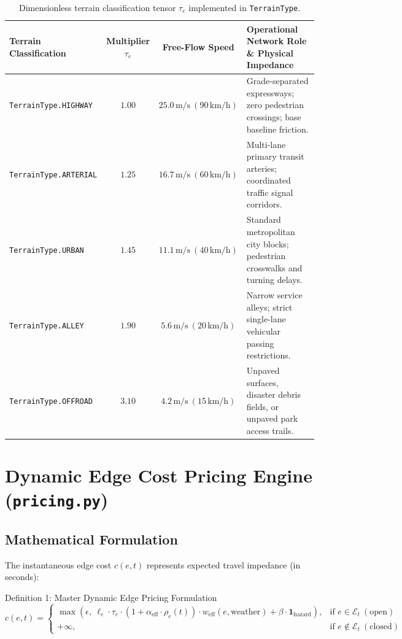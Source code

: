 \documentclass[10pt,a4paper]{article}
\begin{document}
\begin{table}[H]
\centering
\sffamily\scriptsize
\renewcommand{\arraystretch}{1.12}
\begin{tabularx}{\textwidth}{l c c X}
\toprule
\textbf{Terrain Classification} & \textbf{Multiplier $\tau_e$} & \textbf{Free-Flow Speed} & \textbf{Operational Network Role \& Physical Impedance} \\
\midrule
\texttt{TerrainType.HIGHWAY}   & $1.00$ & $25.0\,\text{m/s}\ (90\,\text{km/h})$ & Grade-separated expressways; zero pedestrian crossings; base baseline friction. \\
\texttt{TerrainType.ARTERIAL}  & $1.25$ & $16.7\,\text{m/s}\ (60\,\text{km/h})$ & Multi-lane primary transit arteries; coordinated traffic signal corridors. \\
\texttt{TerrainType.URBAN}     & $1.45$ & $11.1\,\text{m/s}\ (40\,\text{km/h})$ & Standard metropolitan city blocks; pedestrian crosswalks and turning delays. \\
\texttt{TerrainType.ALLEY}     & $1.90$ & $5.6\,\text{m/s}\ (20\,\text{km/h})$  & Narrow service alleys; strict single-lane vehicular passing restrictions. \\
\texttt{TerrainType.OFFROAD}   & $3.10$ & $4.2\,\text{m/s}\ (15\,\text{km/h})$  & Unpaved surfaces, disaster debris fields, or unpaved park access trails. \\
\bottomrule
\end{tabularx}
\caption{Dimensionless terrain classification tensor $\tau_e$ implemented in \texttt{TerrainType}.}
\label{tab:terrain}
\end{table}

\section{Dynamic Edge Cost Pricing Engine (\texttt{pricing.py})}

\subsection{Mathematical Formulation}
The instantaneous edge cost $c(e, t)$ represents expected travel impedance (in seconds):

\begin{specbox}{Definition 1: Master Dynamic Edge Pricing Formulation}
\begin{equation}
c(e, t) = \begin{cases}
\max\left(\epsilon, \ \ell_e \cdot \tau_e \cdot \left(1 + \alpha_{\text{eff}} \cdot \rho_e(t)\right) \cdot w_{\text{eff}}(e, \text{weather}) + \beta \cdot \mathbf{1}_{\text{hazard}}\right), & \text{if } e \in \mathcal{E}_t \ (\text{open}) \\[8pt]
+\infty, & \text{if } e \notin \mathcal{E}_t \ (\text{closed})
\end{cases}
\label{eq:master_cost}
\end{equation}
\end{specbox}
\end{document}

